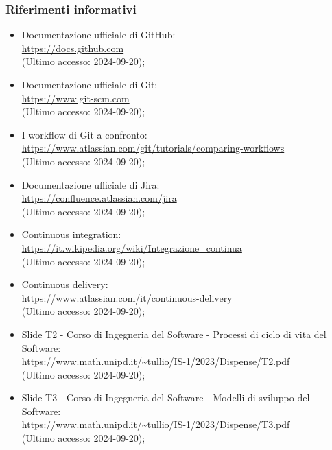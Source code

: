 \subsubsection{Riferimenti informativi}
\begin{itemize}
  \item Documentazione ufficiale di GitHub: \\ \href{https://docs.github.com}{https://docs.github.com}  \\ (Ultimo accesso: 2024-09-20);
  \item Documentazione ufficiale di Git: \\ \href{https://www.git-scm.com}{https://www.git-scm.com}  \\ (Ultimo accesso: 2024-09-20);
  \item I workflow di Git a confronto: \\ \href{https://www.atlassian.com/git/tutorials/comparing-workflows}{https://www.atlassian.com/git/tutorials/comparing-workflows}  \\ (Ultimo accesso: 2024-09-20);
  \item Documentazione ufficiale di Jira: \\ \href{https://confluence.atlassian.com/jira}{https://confluence.atlassian.com/jira}  \\ (Ultimo accesso: 2024-09-20);
  \item Continuous integration: \\ \href{https://it.wikipedia.org/wiki/Integrazionecontinua}{https://it.wikipedia.org/wiki/Integrazione\_continua}  \\ (Ultimo accesso: 2024-09-20);
  \item Continuous delivery: \\ \href{https://www.atlassian.com/it/continuous-delivery}{https://www.atlassian.com/it/continuous-delivery}  \\ (Ultimo accesso: 2024-09-20);
  \item Slide T2 - Corso di Ingegneria del Software - Processi di ciclo di vita del Software: \\ \href{https://www.math.unipd.it/~tullio/IS-1/2023/Dispense/T2.pdf}{https://www.math.unipd.it/\textasciitilde tullio/IS-1/2023/Dispense/T2.pdf}  \\ (Ultimo accesso: 2024-09-20);
  \item Slide T3 - Corso di Ingegneria del Software - Modelli di sviluppo del Software: \\ \href{https://www.math.unipd.it/~tullio/IS-1/2023/Dispense/T3.pdf}{https://www.math.unipd.it/\textasciitilde tullio/IS-1/2023/Dispense/T3.pdf}  \\ (Ultimo accesso: 2024-09-20);

\end{itemize}
